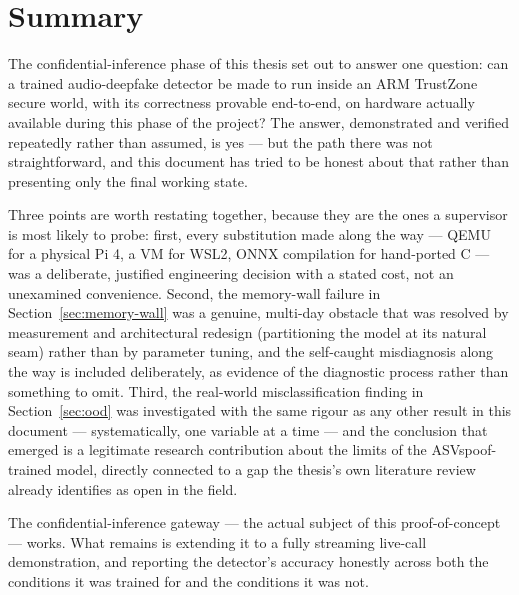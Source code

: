 \documentclass[11pt,a4paper]{report}
\begin{document}
\chapter{Summary}

The confidential-inference phase of this thesis set out to answer one question: can a trained
audio-deepfake detector be made to run inside an ARM TrustZone secure world, with its correctness
provable end-to-end, on hardware actually available during this phase of the project? The answer,
demonstrated and verified repeatedly rather than assumed, is yes --- but the path there was not
straightforward, and this document has tried to be honest about that rather than presenting only the
final working state.

Three points are worth restating together, because they are the ones a supervisor is most likely to
probe: first, every substitution made along the way --- QEMU for a physical Pi 4, a VM for WSL2, ONNX
compilation for hand-ported C --- was a deliberate, justified engineering decision with a stated
cost, not an unexamined convenience. Second, the memory-wall failure in
Section~\ref{sec:memory-wall} was a genuine, multi-day obstacle that was resolved by measurement
and architectural redesign (partitioning the model at its natural seam) rather than by parameter
tuning, and the self-caught misdiagnosis along the way is included deliberately, as evidence of the
diagnostic process rather than something to omit. Third, the real-world misclassification finding in
Section~\ref{sec:ood} was investigated with the same rigour as any other result in this document ---
systematically, one variable at a time --- and the conclusion that emerged is a legitimate research
contribution about the limits of the ASVspoof-trained model, directly connected to a gap the
thesis's own literature review already identifies as open in the field.

The confidential-inference gateway --- the actual subject of this proof-of-concept --- works. What
remains is extending it to a fully streaming live-call demonstration, and reporting the detector's
accuracy honestly across both the conditions it was trained for and the conditions it was not.
\end{document}
